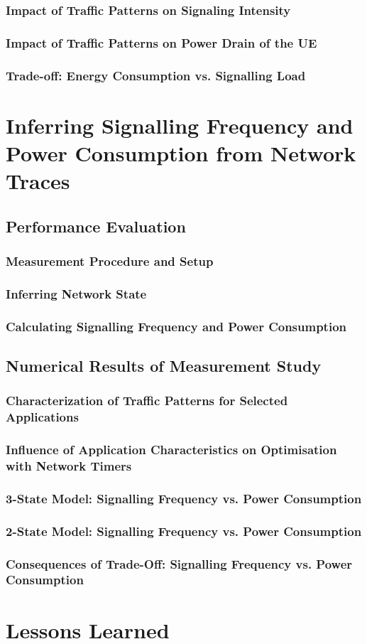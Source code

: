 \subsubsection*{Impact of Traffic Patterns on Signaling Intensity}
\subsubsection*{Impact of Traffic Patterns on Power Drain of the UE}
\subsubsection*{Trade-off: Energy Consumption vs. Signalling Load}

\section{Inferring Signalling Frequency and Power Consumption from
Network Traces}
\cite{Schwartz2013a}
\subsection{Performance Evaluation}
\subsubsection*{Measurement Procedure and Setup}
\subsubsection*{Inferring Network State}
\subsubsection*{Calculating Signalling Frequency and Power Consumption}

\subsection{Numerical Results of Measurement Study}
\subsubsection*{Characterization of Traffic Patterns for Selected Applications}
\subsubsection*{Influence of Application Characteristics on Optimisation with Network Timers}
\subsubsection*{3-State Model: Signalling Frequency vs. Power Consumption}
\subsubsection*{2-State Model: Signalling Frequency vs. Power Consumption}
\subsubsection*{Consequences of Trade-Off: Signalling Frequency vs. Power Consumption}




\section{Lessons Learned}